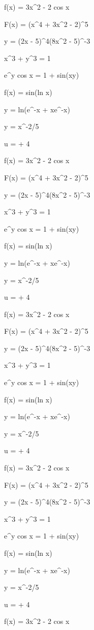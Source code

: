 \documentclass[11pt,a4paper]{article}
\begin{document}
f(x) = 3x^2 - 2 cos x


 F(x) = (x^4 + 3x^2 - 2)^5

 y = (2x - 5)^4(8x^2 - 5)^{-3}

 x^3 + y^3 = 1

 e^y cos x = 1 + sin(xy)

 f(x) = sin(ln x)

 y = ln(e^{-x} + xe^{-x})

y = x^{-2/5}

u =  + 4

f(x) = 3x^2 - 2 cos x


 F(x) = (x^4 + 3x^2 - 2)^5

 y = (2x - 5)^4(8x^2 - 5)^{-3}

 x^3 + y^3 = 1

 e^y cos x = 1 + sin(xy)

 f(x) = sin(ln x)

 y = ln(e^{-x} + xe^{-x})

y = x^{-2/5}

u =  + 4

f(x) = 3x^2 - 2 cos x


 F(x) = (x^4 + 3x^2 - 2)^5

 y = (2x - 5)^4(8x^2 - 5)^{-3}

 x^3 + y^3 = 1

 e^y cos x = 1 + sin(xy)

 f(x) = sin(ln x)

 y = ln(e^{-x} + xe^{-x})

y = x^{-2/5}

u =  + 4

f(x) = 3x^2 - 2 cos x


 F(x) = (x^4 + 3x^2 - 2)^5

 y = (2x - 5)^4(8x^2 - 5)^{-3}

 x^3 + y^3 = 1

 e^y cos x = 1 + sin(xy)

 f(x) = sin(ln x)

 y = ln(e^{-x} + xe^{-x})

y = x^{-2/5}

u =  + 4

f(x) = 3x^2 - 2 cos x

\end{document}
